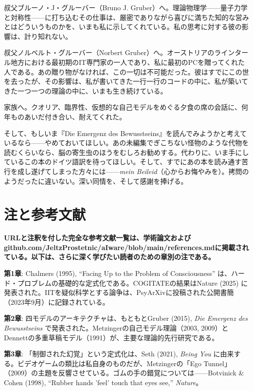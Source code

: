 \documentclass[11pt, twoside, openright]{book}
\begin{document}
叔父ブルーノ・J・グルーバー（Bruno J. Gruber）へ。理論物理学------量子力学と対称性------に打ち込むその仕事は、厳密でありながら喜びに満ちた知的な営みとはどういうものかを、いまも私に示してくれている。私の思考に対する彼の影響は、計り知れない。

叔父ノルベルト・グルーバー（Norbert Gruber）へ。オーストリアのラインタール地方における最初期のIT専門家の一人であり、私に最初のPCを贈ってくれた人である。あの贈り物がなければ、この一切は不可能だった。彼はすでにこの世を去ったが、その影響は、私が書いてきた一行一行のコードの中に、私が築いてきた一つ一つの理論の中に、いまも生き続けている。

家族へ。クオリア、臨界性、仮想的な自己モデルをめぐる夕食の席の会話に、何年ものあいだ付き合い、耐えてくれた。

そして、もしいま『Die Emergenz des Bewusstseins』を読んでみようかと考えているなら------やめておいてほしい。あの未編集でぎこちない怪物のような代物を読むくらいなら、脳の寄生虫のほうをむしろお勧めする。代わりに、いま手にしているこの本のドイツ語訳を待ってほしい。そして、すでにあの本を読み通す苦行を成し遂げてしまった方々には------\textit{mein Beileid}（心からお悔やみを）。拷問のようだったに違いない。深い同情を、そして感謝を捧げる。


\chapter*{注と参考文献}

\textbf{URLと注釈を付した完全な参考文献一覧は、学術論文およびgithub.com/JeltzProstetnic/aIware/blob/main/references.mdに掲載されている。以下は、さらに深く学びたい読者のための章別の注である。}

\textbf{第1章}: Chalmers (1995), ``Facing Up to the Problem of Consciousness'' は、ハード・プロブレムの基礎的な定式化である。COGITATEの結果はNature (2025) に発表された。IITを疑似科学とする論争は、PsyArXivに投稿された公開書簡（2023年9月）に記録されている。

\textbf{第2章}: 四モデルのアーキテクチャは、もともとGruber (2015), \textit{Die Emergenz des Bewusstseins} で発表された。Metzingerの自己モデル理論（2003, 2009）とDennettの多重草稿モデル（1991）が、主要な理論的先行研究である。

\textbf{第3章}: 「制御された幻覚」という定式化は、Seth (2021), \textit{Being You} に由来する。ビデオゲームの類比は私自身のものだが、Metzingerの「Ego Tunnel」（2009）の主題を反響させている。ゴムの手の錯覚については------Botvinick \& Cohen (1998), ``Rubber hands 'feel' touch that eyes see,'' \textit{Nature}。
\end{document}
